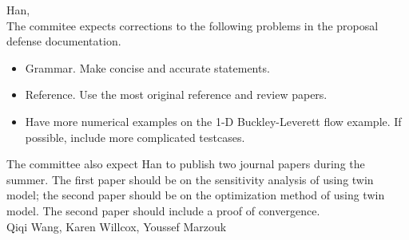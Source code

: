 \documentclass[a4paper,onecolumn]{article}
\begin{document}
\setcounter{page}{1}


\noindent Han,\\

The commitee expects corrections to the following problems in the proposal defense documentation.
\begin{itemize}
\item  Grammar. Make concise and accurate statements.
\item  Reference. Use the most original reference and review papers.
\item  Have more numerical examples on the 1-D Buckley-Leverett flow example. If possible, include
more complicated testcases.
\end{itemize}

The committee also expect Han to publish two journal papers during the summer. The first paper
should be on the sensitivity analysis of using twin model; the second paper should be on
the optimization method of using twin model. The second paper should include a proof of convergence.\\

\noindent Qiqi Wang, Karen Willcox, Youssef Marzouk
\end{document}
